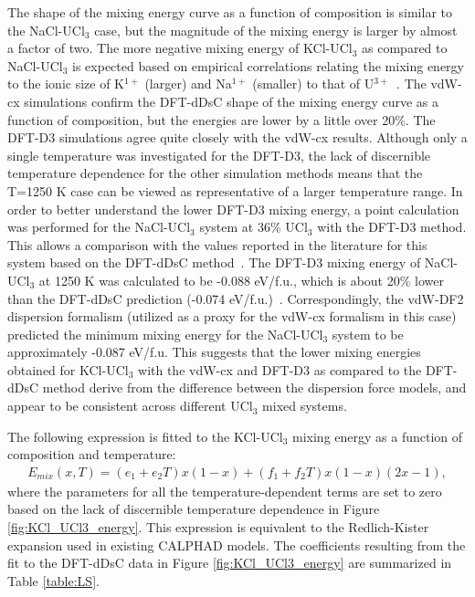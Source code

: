 \documentclass[preprint,3p,10pt,number,sort&compress]{elsarticle}
\begin{document}
The shape of the mixing energy curve as a function of composition is similar to the NaCl-UCl$_3$ case, but the magnitude of the mixing energy is larger by almost a factor of two. The more negative mixing energy of KCl-UCl$_3$ as compared to NaCl-UCl$_3$ is expected based on empirical correlations relating the mixing energy to the ionic size of K$^{1+}$ (larger) and Na$^{1+}$ (smaller) to that of U$^{3+}$~\cite{YIN2020,Pinto}. The vdW-cx simulations confirm the DFT-dDsC shape of the mixing energy curve as a function of composition, but the energies are lower by a little over 20\%. The DFT-D3 simulations agree quite closely with the vdW-cx results. Although only a single temperature was investigated for the DFT-D3, the lack of discernible temperature dependence for the other simulation methods means that the T=1250 K case can be viewed as representative of a larger temperature range. In order to better understand the lower DFT-D3 mixing energy, a point calculation was performed for the NaCl-UCl$_3$ system at 36\% UCl$_3$ with the DFT-D3 method. This allows a comparison with the values reported in the literature for this system based on the DFT-dDsC method~\cite{Andersson}. 
The DFT-D3 mixing energy of NaCl-UCl$_3$ at 1250 K was calculated to be -0.088 eV/f.u., which is about 20\% lower than the DFT-dDsC prediction (-0.074 eV/f.u.)~\cite{Andersson}. Correspondingly, the vdW-DF2 dispersion formalism (utilized as a proxy for the vdW-cx formalism in this case) predicted the minimum mixing energy for the NaCl-UCl$_3$ system to be approximately -0.087 eV/f.u. This suggests that the lower mixing energies obtained for KCl-UCl$_3$ with the vdW-cx and DFT-D3 as compared to the DFT-dDsC method derive from the difference between the dispersion force models, and appear to be consistent across different UCl$_3$ mixed systems. 

The following expression is fitted to the KCl-UCl$_3$ mixing energy as a function of composition and temperature:
\begin{equation}
\begin{split}
E_{mix}(x,T)=(e_1+e_2T)x(1-x)+(f_1+f_2T)x(1-x)(2x-1),
\label{eq:LSE}
\end{split}
\end{equation}
where the parameters for all the temperature-dependent terms are set to zero based on the lack of discernible temperature dependence in Figure \ref{fig:KCl_UCl3_energy}. This expression is equivalent to the Redlich-Kister expansion used in existing CALPHAD models. The coefficients resulting from the fit to the DFT-dDsC data in Figure \ref{fig:KCl_UCl3_energy} are summarized in Table \ref{table:LS}. 
\end{document}
